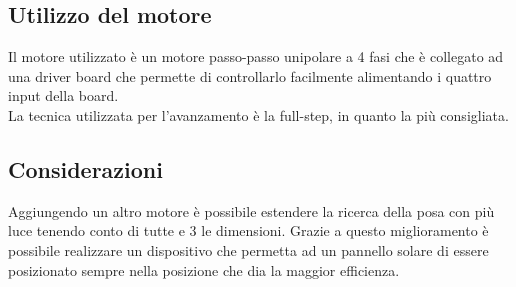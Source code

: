 \documentclass[12pt,oneside,a4paper]{article}
\begin{document}
\subsection{Utilizzo del motore}
Il motore utilizzato è un motore passo-passo unipolare a 4 fasi che è collegato ad una driver board che permette di controllarlo facilmente alimentando i quattro input della board.
\\La tecnica utilizzata per l'avanzamento è la full-step, in quanto la più consigliata.


\subsection{Considerazioni}
Aggiungendo un altro motore è possibile estendere la ricerca della posa con più luce tenendo conto di tutte e 3 le dimensioni.
Grazie a questo miglioramento è possibile realizzare un dispositivo che permetta ad un pannello solare di essere posizionato sempre nella posizione che dia la maggior efficienza.




\end{document}

